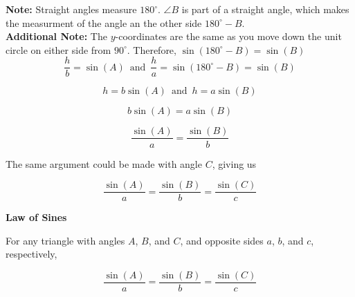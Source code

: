 \documentclass{ximera}
\begin{document}
\textbf{Note:}  Straight angles measure $180^{\circ}$.  $\angle B$ is part of a straight angle, which makes the measurment of the angle an the other side $180^{\circ} - B$. \\

\textbf{Additional Note:} The $y$-coordinates are the same as you move down the unit circle on either side from $90^{\circ}$.  Therefore, $\sin(180^{\circ} - B) = \sin(B)$ \\




\[    \frac{h}{b} = \sin(A)   \, \text{ and } \,    \frac{h}{a} = \sin(180^{\circ} - B)  = \sin(B)      \]



\[    h = b \sin(A)      \, \text{ and } \,    h = a \sin(B)    \]

\[     b \sin(A)  = a \sin(B)    \]


\[    \frac{\sin(A)}{a} = \frac{\sin(B)}{b}      \]




The same argument could be made with angle $C$, giving us








\[    \frac{\sin(A)}{a} = \frac{\sin(B)}{b}  = \frac{\sin(C)}{c}    \]






\begin{theorem}  \textbf{\textcolor{green!50!black}{Law of Sines}} 



For any triangle with angles $A$, $B$, and $C$, and opposite sides $a$, $b$, and $c$, respectively, 


\[    \frac{\sin(A)}{a} = \frac{\sin(B)}{b}  = \frac{\sin(C)}{c}    \]


\end{theorem}
\end{document}
